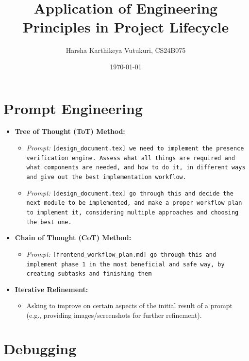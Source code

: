 \documentclass[11pt,a4paper]{article}
\title{\textbf{Application of Engineering Principles in Project Lifecycle}}
\author{Harsha Karthikeya Vutukuri, CS24B075}
\date{\today}
\begin{document}
\maketitle

\section{Prompt Engineering}

\begin{itemize}[leftmargin=*, itemsep=6pt]
    \item \textbf{Tree of Thought (ToT) Method:}
    \begin{itemize}[itemsep=4pt]
        \item \textit{Prompt:} \texttt{[design\_document.tex] we need to implement the presence verification engine. Assess what all things are required and what components are needed, and how to do it, in different ways and give out the best implementation workflow.}
        \item \textit{Prompt:} \texttt{[design\_document.tex] go through this and decide the next module to be implemented, and make a proper workflow plan to implement it, considering multiple approaches and choosing the best one.}
    \end{itemize}

    \item \textbf{Chain of Thought (CoT) Method:}
    \begin{itemize}[itemsep=4pt]
        \item \textit{Prompt:} \texttt{[frontend\_workflow\_plan.md] go through this and implement phase 1 in the most beneficial and safe way, by creating subtasks and finishing them}
    \end{itemize}

    \item \textbf{Iterative Refinement:}
    \begin{itemize}[itemsep=4pt]
        \item Asking to improve on certain aspects of the initial result of a prompt (e.g., providing images/screenshots for further refinement).
    \end{itemize}
\end{itemize}

\section{Debugging}
\end{document}
